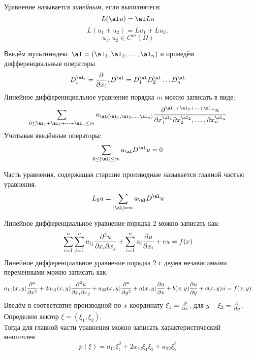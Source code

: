 \documentclass[../main.tex]{subfiles}
\begin{document}
Уравнение называется \textit{линейным}, если выполнятеся:
    \[L(\al u)=\al Lu\]
    \[L(u_1+u_2)=Lu_1 + Lu_2,\]
    \[u_1, u_2 \in C^m(\Omega)\]

Введём мультииндекс $\al = (\al_1,\al_2,\dots,\al_n)$ и приведём дифференциальные операторы
\[D^{\al_i}_i=\pderiv{ }{x_i}, D^\al = D^\al_1 D^\al_2\dots D^\al_n\]
Линейное дифференициальное уравнение порядка $m$ можно записать в виде:
\[
    \sum_{0 \leq \al_1+\al_2+\dots+\al_n \leq m}
    a_{\al(\al_1, \al_2, \dots, \al_n)}
    \pderiv{^{\al_1+\al_2+\dots+\al_n}u}
    {x_1^{\al_1} \partial{x_2^{\al_2}}, \dots, \partial{x_n^{\al_n}}}
\]
Учитывая введённые операторы:
\[
    \sum_{0 \leq |\al| \leq m}a_\al D^\al u = 0
\]

\begin{definition}
    Часть уравнения, содержащая старшие производные называется
    главной частью уравнения.
    \[L_0u = \sum_{|\al|=m} a_\al D^\al u\]
\end{definition}
Линейное дифференциальное уравнение порядка 2 можно записать как:
\[
    \sum^n_{i=1}\sum^n_{j=1}a_{ij}\frac{\partial ^2u}{\partial x_i \partial{x_j}} + 
    \sum^n_{i=1}a_i\frac{\partial u}{\partial x_i} + eu = f(x)
\]
Линейное дифференциальное уравнение порядка 2 с двумя 
независимыми переменными можно записать как:
\begin{equation}
    \label{eq:1.1} %
    a_{11}(x,y)\pderiv{^u}{x^2} + 2a_{12}(x,y)\pderiv{^2u}{x_i \partial{x_j}} +
    a_{22}(x,y)\pderiv{^u}{y^2} + a(x,y)\pderiv{u}{x} + b(x,y)\pderiv{u}{y} + c(x,y)u = f(x,y)
\end{equation}
Введём в соответсвтие производной по $x$ координату $\xi_1=\frac{\partial  }{\partial x}$,
для $y$ -- $\xi_2 = \frac{\partial  }{\partial y}$. Определим вектор $\xi=(\xi_1, \xi_2)$.\\
Тогда для главной части уравнения можно записать характеристический многочлен
\[
    p(\xi)=a_{11}\xi_1^2 + 2a_{12}\xi_1\xi_2 + a_{22}\xi_2^2
\]
\end{document}
